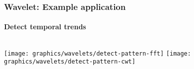     \begin{frame}
        \frametitle{Wavelet: Example application}
        \framesubtitle{Detect temporal trends}

        \begin{columns}[onlytextwidth]
            \texttt{[image: graphics/wavelets/detect-pattern-fft]}
            \texttt{[image: graphics/wavelets/detect-pattern-cwt]}
        \end{columns}
        
    \end{frame}

